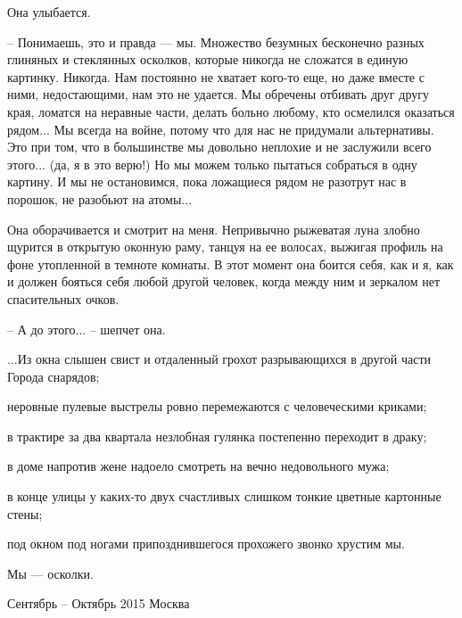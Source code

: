 \documentclass[a5paper]{article}
\begin{document}
Она улыбается.

-- Понимаешь, это и правда --- мы. Множество безумных бесконечно разных глиняных и стеклянных осколков, которые никогда не сложатся в единую картинку. Никогда. Нам постоянно не хватает кого-то еще, но даже вместе с ними, недостающими, нам это не удается. Мы обречены отбивать друг другу края, ломатся на неравные части, делать больно любому, кто осмелился оказаться рядом... Мы всегда на войне, потому что для нас не придумали альтернативы. Это при том, что в большинстве мы довольно неплохие и не заслужили всего этого... (да, я в это верю!) Но мы можем только пытаться собраться в одну картину. И мы не остановимся, пока ложащиеся рядом не разотрут нас в порошок, не разобьют на атомы...

Она оборачивается и смотрит на меня. Непривычно рыжеватая луна злобно щурится в открытую оконную раму, танцуя на ее волосах, выжигая профиль на фоне утопленной в темноте комнаты. В этот момент она боится себя, как и я, как и должен бояться себя любой другой человек, когда между ним и зеркалом нет спасительных очков.

-- А до этого... -- шепчет она.

...Из окна слышен свист и отдаленный грохот разрывающихся в другой части Города снарядов;

неровные пулевые выстрелы ровно перемежаются с человеческими криками;

в трактире за два квартала незлобная гулянка постепенно переходит в драку;

в доме напротив жене надоело смотреть на вечно недовольного мужа;

в конце улицы у каких-то двух счастливых слишком тонкие цветные картонные стены;

под окном под ногами припозднившегося прохожего звонко хрустим мы.

Мы --- осколки.

Сентябрь -- Октябрь 2015
Москва
\end{document}
